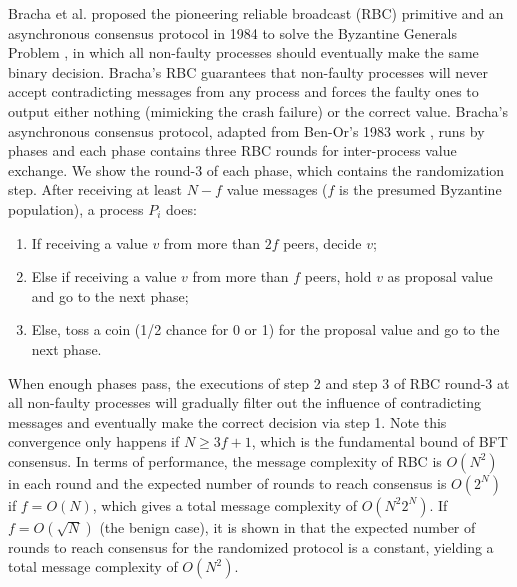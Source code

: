 Bracha et al.  proposed the pioneering reliable broadcast (RBC) primitive and an asynchronous consensus protocol in 1984 
to solve the Byzantine Generals Problem , in which all non-faulty processes should eventually make the same binary decision.
Bracha's RBC guarantees that non-faulty processes will never accept contradicting messages from any process and forces the faulty ones to output either nothing (mimicking the crash failure) or the correct value.
Bracha's asynchronous consensus protocol, adapted from Ben-Or's 1983 work , runs by phases and each phase contains three RBC rounds for inter-process value exchange. We show the round-3 of each phase, which contains the randomization step. After receiving at least $N-f$ value messages ($f$ is the presumed Byzantine population), a process $P_i$ does:
\begin{enumerate}[label=\arabic*.]
    \item If receiving a value $v$ from more than $2f$ peers, decide $v$;
    \item Else if receiving a value $v$ from more than $f$ peers, hold $v$ as proposal value and go to the next phase;
    \item Else, toss a coin (1/2 chance for 0 or 1) for the proposal value and go to the next phase.
\end{enumerate}
When enough phases pass, the executions of step 2 and step 3 of RBC round-3 at all non-faulty processes will gradually filter out the influence of contradicting messages and eventually make the correct decision via step 1. Note this convergence only happens if $N\geq 3f+1$, which is the fundamental bound of BFT consensus. 
In terms of performance, the message complexity of RBC is $O(N^2)$ in each round and the expected number of rounds to reach consensus is $O(2^N)$ if $f=O(N)$, which gives a total message complexity of $O(N^2 2^N)$. If $f=O(\sqrt{N})$ (the benign case), it is shown in  that the expected number of rounds to reach consensus for the randomized protocol is a constant, yielding a total message complexity of $O(N^2)$.

